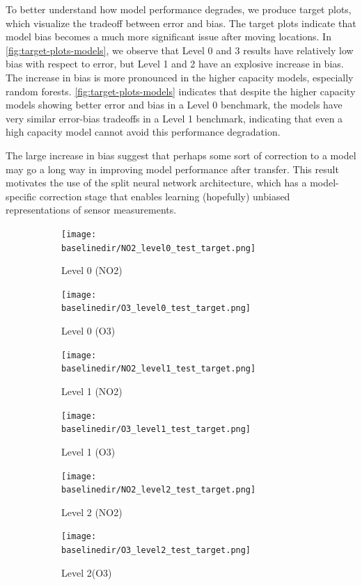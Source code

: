 \documentclass[journal abbreviation, manuscript]{copernicus}
\begin{document}
To better understand how model performance degrades, we produce
target plots, which visualize the tradeoff between error and bias.
The target plots indicate that model bias becomes a much more significant issue
after moving locations. In \autoref{fig:target-plots-models}, we observe
that Level 0 and 3 results have relatively low bias with respect
to error, but Level 1 and 2 have an explosive increase
in bias. The increase in bias is more pronounced in the higher capacity models, especially random forests. \autoref{fig:target-plots-models} indicates that despite the higher capacity models showing better error and bias in a Level 0 benchmark, the models have very similar error-bias tradeoffs in a Level 1 benchmark, indicating that even a high capacity model cannot avoid this performance degradation.

The large increase in bias suggest that perhaps some sort of correction to a model may go a long way in improving model performance after transfer. This result motivates the use of the split neural network architecture, which has a model-specific correction stage that enables learning (hopefully) unbiased representations of sensor measurements.

\begin{figure}[H]
\centering
\begin{subfigure}{0.45\textwidth}
\texttt{[image: \\baselinedir/NO2\_level0\_test\_target.png]}
\caption{Level 0 (NO2)}
\end{subfigure}
\centering
\begin{subfigure}{0.45\textwidth}
\texttt{[image: \\baselinedir/O3\_level0\_test\_target.png]}
\caption{Level 0 (O3)}
\end{subfigure}
\centering
\begin{subfigure}{0.45\textwidth}
\texttt{[image: \\baselinedir/NO2\_level1\_test\_target.png]}
\caption{Level 1 (NO2)}
\end{subfigure}
\begin{subfigure}{0.45\textwidth}
\texttt{[image: \\baselinedir/O3\_level1\_test\_target.png]}
\caption{Level 1 (O3)}
\end{subfigure}
\begin{subfigure}{0.45\textwidth}
\texttt{[image: \\baselinedir/NO2\_level2\_test\_target.png]}
\caption{Level 2 (NO2)}
\end{subfigure}
\begin{subfigure}{0.45\textwidth}
\texttt{[image: \\baselinedir/O3\_level2\_test\_target.png]}
\caption{Level 2(O3)}
\end{subfigure}
\caption{}
\label{fig:target-plots-levels}
\end{figure}
\end{document}
